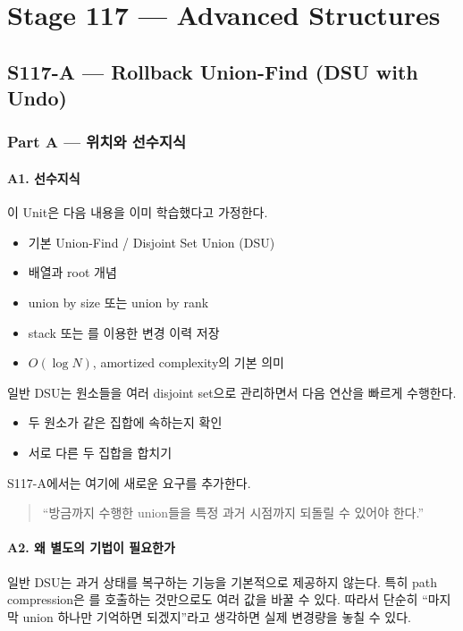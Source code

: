 \part{Stage 117 --- Advanced Structures}
\chapter{S117-A --- Rollback Union-Find (DSU with Undo)}

\section{Part A --- 위치와 선수지식}

\subsection{A1. 선수지식}
이 Unit은 다음 내용을 이미 학습했다고 가정한다.
\begin{itemize}
\item 기본 Union-Find / Disjoint Set Union (DSU)
\item {} 배열과 root 개념
\item union by size 또는 union by rank
\item stack 또는 를 이용한 변경 이력 저장
\item $O(\log N)$, amortized complexity의 기본 의미
\end{itemize}

일반 DSU는 원소들을 여러 disjoint set으로 관리하면서 다음 연산을 빠르게 수행한다.
\begin{itemize}
\item 두 원소가 같은 집합에 속하는지 확인
\item 서로 다른 두 집합을 합치기
\end{itemize}

S117-A에서는 여기에 새로운 요구를 추가한다.

\begin{quote}
``방금까지 수행한 union들을 특정 과거 시점까지 되돌릴 수 있어야 한다.''
\end{quote}

\subsection{A2. 왜 별도의 기법이 필요한가}
일반 DSU는 과거 상태를 복구하는 기능을 기본적으로 제공하지 않는다. 특히 path compression은 를 호출하는 것만으로도 여러  값을 바꿀 수 있다. 따라서 단순히 ``마지막 union 하나만 기억하면 되겠지''라고 생각하면 실제 변경량을 놓칠 수 있다.

